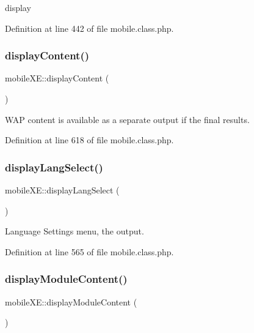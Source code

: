 display 



Definition at line 442 of file mobile.\+class.\+php.

\hypertarget{classmobileXE_a755b22d15673cc9c172e1506b4e73418}{}\label{classmobileXE_a755b22d15673cc9c172e1506b4e73418} 
\subsubsection{\texorpdfstring{display\+Content()}{displayContent()}}
{\footnotesize\ttfamily mobile\+X\+E\+::display\+Content (\begin{DoxyParamCaption}{ }\end{DoxyParamCaption})}



W\+AP content is available as a separate output if the final results. 



Definition at line 618 of file mobile.\+class.\+php.

\hypertarget{classmobileXE_aaed5eaefceeffc2a3509ae5d297bc379}{}\label{classmobileXE_aaed5eaefceeffc2a3509ae5d297bc379} 
\subsubsection{\texorpdfstring{display\+Lang\+Select()}{displayLangSelect()}}
{\footnotesize\ttfamily mobile\+X\+E\+::display\+Lang\+Select (\begin{DoxyParamCaption}{ }\end{DoxyParamCaption})}



Language Settings menu, the output. 



Definition at line 565 of file mobile.\+class.\+php.

\hypertarget{classmobileXE_a37f91cc176cd83a7816680a8be49f2ba}{}\label{classmobileXE_a37f91cc176cd83a7816680a8be49f2ba} 
\subsubsection{\texorpdfstring{display\+Module\+Content()}{displayModuleContent()}}
{\footnotesize\ttfamily mobile\+X\+E\+::display\+Module\+Content (\begin{DoxyParamCaption}{ }\end{DoxyParamCaption})}



